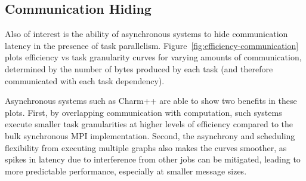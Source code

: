 \subsection{Communication Hiding}



Also of interest is the ability of asynchronous systems to
hide communication latency in the presence of task
parallelism. Figure~\ref{fig:efficiency-communication} plots efficiency vs task
granularity curves for varying amounts of
communication, determined by the number
of bytes produced by each task (and therefore communicated with each
task dependency).

Asynchronous systems such as Charm++ are able to show two benefits in
these plots. First, by overlapping communication with computation,
such systems execute smaller task granularities at higher
levels of efficiency compared to the bulk synchronous MPI
implementation. Second, the asynchrony and scheduling flexibility from
executing multiple graphs also makes the curves smoother,
as spikes in latency due to interference from other jobs can be
mitigated, leading to more predictable performance, especially at
smaller message sizes.
